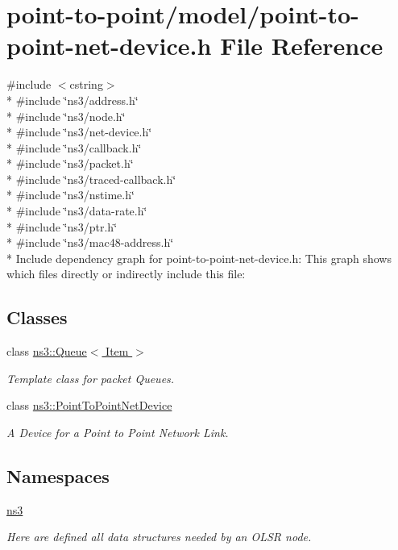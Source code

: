 \hypertarget{point-to-point-net-device_8h}{}\section{point-\/to-\/point/model/point-\/to-\/point-\/net-\/device.h File Reference}
\label{point-to-point-net-device_8h}
{\ttfamily \#include $<$cstring$>$}\\*
{\ttfamily \#include \char`\"{}ns3/address.\+h\char`\"{}}\\*
{\ttfamily \#include \char`\"{}ns3/node.\+h\char`\"{}}\\*
{\ttfamily \#include \char`\"{}ns3/net-\/device.\+h\char`\"{}}\\*
{\ttfamily \#include \char`\"{}ns3/callback.\+h\char`\"{}}\\*
{\ttfamily \#include \char`\"{}ns3/packet.\+h\char`\"{}}\\*
{\ttfamily \#include \char`\"{}ns3/traced-\/callback.\+h\char`\"{}}\\*
{\ttfamily \#include \char`\"{}ns3/nstime.\+h\char`\"{}}\\*
{\ttfamily \#include \char`\"{}ns3/data-\/rate.\+h\char`\"{}}\\*
{\ttfamily \#include \char`\"{}ns3/ptr.\+h\char`\"{}}\\*
{\ttfamily \#include \char`\"{}ns3/mac48-\/address.\+h\char`\"{}}\\*
Include dependency graph for point-\/to-\/point-\/net-\/device.h\+:
This graph shows which files directly or indirectly include this file\+:
\subsection*{Classes}
\begin{DoxyCompactItemize}
\item 
class \hyperlink{classns3_1_1Queue}{ns3\+::\+Queue$<$ Item $>$}
\begin{DoxyCompactList}\small\item\em Template class for packet Queues. \end{DoxyCompactList}\item 
class \hyperlink{classns3_1_1PointToPointNetDevice}{ns3\+::\+Point\+To\+Point\+Net\+Device}
\begin{DoxyCompactList}\small\item\em A Device for a Point to Point Network Link. \end{DoxyCompactList}\end{DoxyCompactItemize}
\subsection*{Namespaces}
\begin{DoxyCompactItemize}
\item 
 \hyperlink{namespacens3}{ns3}
\begin{DoxyCompactList}\small\item\em Here are defined all data structures needed by an O\+L\+SR node. \end{DoxyCompactList}\end{DoxyCompactItemize}
